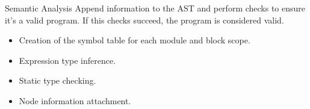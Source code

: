 \begin{slide}
    \begin{block}{Semantic Analysis}
        Append information to the AST and perform checks to ensure it's a valid program.
        If this checks succeed, the program is considered valid.
    \end{block}
    \vfill
    \begin{itemize}
        \item Creation of the symbol table for each module and block scope.
        \item Expression type inference.
        \item Static type checking.
        \item Node information attachment.
    \end{itemize}
\end{slide}
